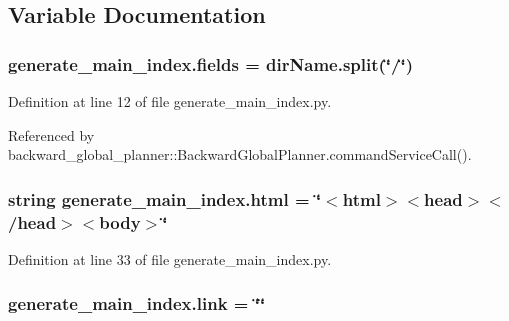 \subsection{Variable Documentation}
\subsubsection[{\texorpdfstring{fields}{fields}}]{\setlength{\rightskip}{0pt plus 5cm}generate\+\_\+main\+\_\+index.\+fields = dir\+Name.\+split(\char`\"{}/\char`\"{})}\hypertarget{namespacegenerate__main__index_a6a2a34fa223d797862d3574a4de18caf}{}\label{namespacegenerate__main__index_a6a2a34fa223d797862d3574a4de18caf}


Definition at line 12 of file generate\+\_\+main\+\_\+index.\+py.



Referenced by backward\+\_\+global\+\_\+planner\+::\+Backward\+Global\+Planner.\+command\+Service\+Call().

\subsubsection[{\texorpdfstring{html}{html}}]{\setlength{\rightskip}{0pt plus 5cm}string generate\+\_\+main\+\_\+index.\+html = \char`\"{}$<$html$>$$<$head$>$$<$/head$>$$<$body$>$\char`\"{}}\hypertarget{namespacegenerate__main__index_a5d220637cf46430b8734a695b6c91a5d}{}\label{namespacegenerate__main__index_a5d220637cf46430b8734a695b6c91a5d}


Definition at line 33 of file generate\+\_\+main\+\_\+index.\+py.

\subsubsection[{\texorpdfstring{link}{link}}]{\setlength{\rightskip}{0pt plus 5cm}generate\+\_\+main\+\_\+index.\+link = \char`\"{}\char`\"{}}\hypertarget{namespacegenerate__main__index_a1478cc32da5040538a6325c8e4ddd25c}{}\label{namespacegenerate__main__index_a1478cc32da5040538a6325c8e4ddd25c}


